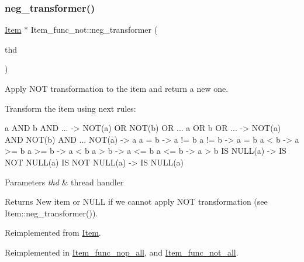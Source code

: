 \mbox{\label{classItem__func__not_abab1c235b067b74dda31f300a50104a4}} 
\subsubsection{\texorpdfstring{neg\+\_\+transformer()}{neg\_transformer()}}
{\footnotesize\ttfamily \mbox{\hyperlink{classItem}{Item}} $\ast$ Item\+\_\+func\+\_\+not\+::neg\+\_\+transformer (\begin{DoxyParamCaption}\item[{T\+HD $\ast$}]{thd }\end{DoxyParamCaption})\hspace{0.3cm}{\ttfamily [virtual]}}

Apply N\+OT transformation to the item and return a new one.

Transform the item using next rules\+: \begin{DoxyVerb}     a AND b AND ...    -> NOT(a) OR NOT(b) OR ...
     a OR b OR ...      -> NOT(a) AND NOT(b) AND ...
     NOT(a)             -> a
     a = b              -> a != b
     a != b             -> a = b
     a < b              -> a >= b
     a >= b             -> a < b
     a > b              -> a <= b
     a <= b             -> a > b
     IS NULL(a)         -> IS NOT NULL(a)
     IS NOT NULL(a)     -> IS NULL(a)\end{DoxyVerb}



\begin{DoxyParams}{Parameters}
{\em thd} & thread handler\\
\hline
\end{DoxyParams}
\begin{DoxyReturn}{Returns}
New item or N\+U\+LL if we cannot apply N\+OT transformation (see Item\+::neg\+\_\+transformer()). 
\end{DoxyReturn}


Reimplemented from \mbox{\hyperlink{classItem}{Item}}.



Reimplemented in \mbox{\hyperlink{classItem__func__nop__all_a6584dde63d69111ad332417b07883229}{Item\+\_\+func\+\_\+nop\+\_\+all}}, and \mbox{\hyperlink{classItem__func__not__all_a5efa58fa1c7361846ec917da2e416c8d}{Item\+\_\+func\+\_\+not\+\_\+all}}.

